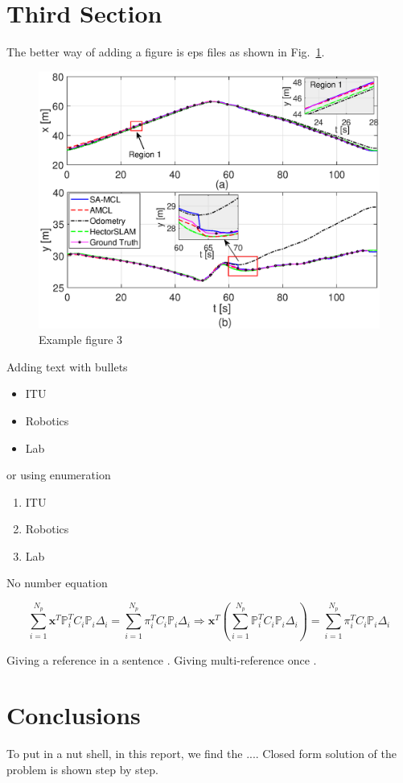 \documentclass[letterpaper,12pt]{article}
\begin{document}
\section{Third Section}

The better way of adding a figure is eps files as shown in Fig.~\ref{fig:example3}.

\begin{figure}
\centering
\includegraphics[width = 0.7\linewidth]{figs/deneme.eps} %
\caption{Example figure 3}
\label{fig:example3}
\end{figure}

Adding text with bullets

\begin{itemize}
	\item ITU
	\item Robotics
	\item Lab
\end{itemize}

or using enumeration

\begin{enumerate}
	\item ITU
	\item Robotics
	\item Lab
\end{enumerate}


No number equation

\begin{equation*}
\label{eq:AfCorObj5} %
\sum_{i=1}^{\mathit{N_p}}\mathbf{x}^T \mathbb{P}_i^T C_i \mathbb{P}_i \Delta_i = \sum_{i=1}^{\mathit{N_p}}\pi_i^T C_i \mathbb{P}_i \Delta_i \Rightarrow \mathbf{x}^T\left( \sum_{i=1}^{\mathit{N_p}} \mathbb{P}_i^T C_i \mathbb{P}_i \Delta_i\right)  = \sum_{i=1}^{\mathit{N_p}}\pi_i^T C_i \mathbb{P}_i \Delta_i
\end{equation*}

Giving a reference in a sentence \cite{Rowekamper2015a}. Giving multi-reference once \cite{besl1992method,du2010affine,du2015probability,greenspan2003approximate}. \lipsum[5]

\section{Conclusions}

To put in a nut shell, in this report, we find the .... Closed form solution of the problem is shown step by step. \lipsum[4]



\end{document}
